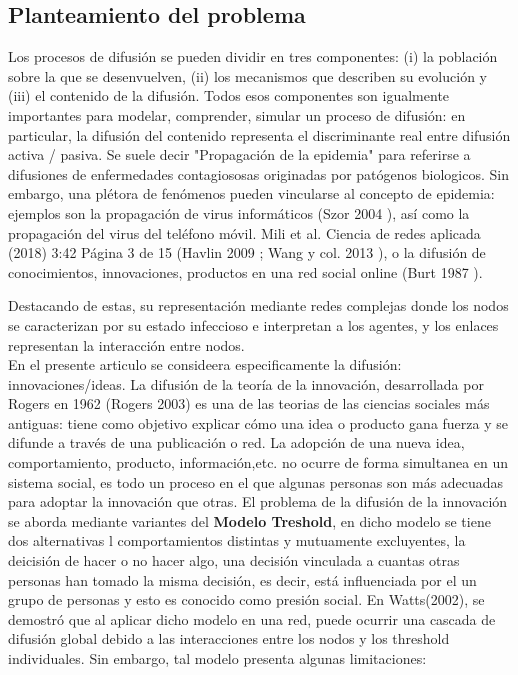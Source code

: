 \documentclass{article}
\begin{document}
 \subsection{Planteamiento del problema}
Los procesos de difusión se pueden dividir en tres componentes: (i) la población sobre la que se
desenvuelven, (ii) los mecanismos que describen su evolución y (iii) el contenido de la difusión. Todos esos  componentes son igualmente importantes para modelar, comprender, simular un proceso de difusión: en particular, la difusión del contenido representa el discriminante real entre difusión activa / pasiva. 
Se suele decir "Propagación de la epidemia" para referirse a difusiones de enfermedades contagiososas originadas por patógenos biologicos. Sin embargo, una plétora de fenómenos pueden vincularse al concepto de epidemia: ejemplos son la propagación de virus informáticos (Szor 2004 ), así como la  propagación del virus del teléfono móvil.
Mili et al. Ciencia de redes aplicada (2018) 3:42 Página 3 de 15 (Havlin 2009 ; Wang y col. 2013 ), o la difusión de conocimientos, innovaciones, productos en una red social online (Burt 1987 ).

Destacando de estas, su representación mediante redes complejas donde los nodos se caracterizan por su estado infeccioso e interpretan a los agentes, y los enlaces representan la interacción entre nodos.
\\
En el presente articulo se consideera especificamente  la difusión: innovaciones/ideas. La difusión de la teoría de la innovación, desarrollada por Rogers en 1962 (Rogers 2003) es una de las teorias de las ciencias sociales más antiguas: tiene como objetivo explicar cómo una idea o producto gana fuerza y se difunde a través de una publicación o red. La adopción de una nueva idea, comportamiento, producto, información,etc. no ocurre de forma simultanea en un sistema social, es todo un proceso en el que algunas personas son más adecuadas para adoptar la innovación que otras. El problema de la difusión de la innovación se aborda mediante variantes del \textbf{Modelo Treshold}, en dicho modelo se tiene dos alternativas l comportamientos distintas y mutuamente excluyentes, la deicisión de hacer o no hacer algo, una decisión vinculada a cuantas otras personas han tomado la misma decisión, es decir, está influenciada por el un grupo de personas y esto es conocido como presión social. En Watts(2002), se demostró que al aplicar dicho modelo en una red, puede ocurrir una cascada de difusión global debido a las interacciones entre los nodos y los threshold individuales. Sin embargo, tal modelo presenta algunas limitaciones: 
\end{document}
